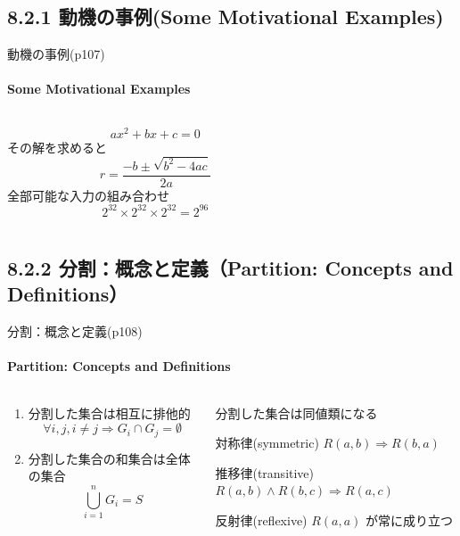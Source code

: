 \subsection{8.2.1 動機の事例(Some Motivational Examples)}
\begin{frame}{動機の事例(p107)}
\framesubtitle{Some Motivational Examples}
\begin{columns}
\begin{column}{0.5\textwidth}
\[ ax^2+bx+c = 0 \]
\pause
その解を求めると
\[ r=\frac{-b \pm \sqrt{b^2-4ac}}{2a} \]
\pause
全部可能な入力の組み合わせ
\[ 2^{32} \times 2^{32} \times 2^{32} = 2^{96}\]
\end{column}
\begin{column}{0.5\textwidth}
\end{column}
\end{columns}
\end{frame}
\subsection{8.2.2 分割：概念と定義（Partition: Concepts and Definitions）}
\begin{frame}[shrink=10]{分割：概念と定義(p108)}
\framesubtitle{Partition: Concepts and Definitions}
\begin{columns}
\begin{column}{0.5\textwidth}
\begin{enumerate}
\item 分割した集合は相互に排他的
    \[ \forall i,j,i\neq j \Rightarrow G_i \cap G_j = \emptyset \]
\pause
\item 分割した集合の和集合は全体の集合
    \[ \bigcup_{i=1}^{n} G_i = S \]
\end{enumerate}

\end{column}
\pause
\begin{column}{0.5\textwidth}
分割した集合は同値類になる
\begin{block}{対称律(symmetric)} $R(a,b) \Rightarrow R(b,a) $ \end{block}
\begin{block}{推移律(transitive)} $R(a,b) \wedge R(b,c) \Rightarrow R(a,c)$ \end{block}
\begin{block}{反射律(reflexive)} $R(a,a)$ が常に成り立つ \end{block}
\end{column}
\end{columns}
\end{frame}
